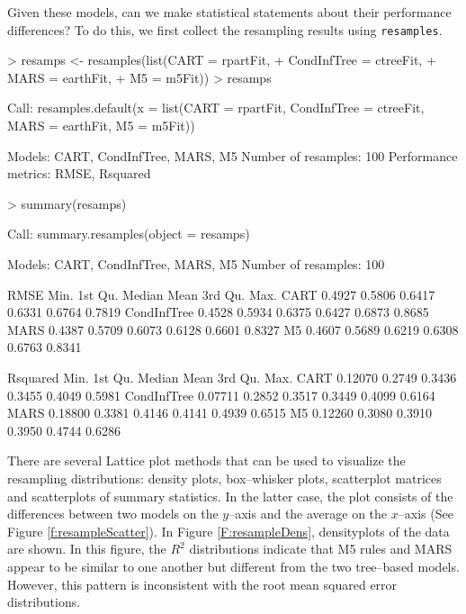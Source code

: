 \documentclass[12pt]{article}
\begin{document}
Given these models, can we make statistical statements about their performance differences? To do this, we first collect the resampling results using \texttt{resamples}.

\begin{Schunk}
\begin{Sinput}
> resamps <- resamples(list(CART = rpartFit,
+                           CondInfTree = ctreeFit,
+                           MARS = earthFit,
+                           M5 = m5Fit))
> resamps
\end{Sinput}
\begin{Soutput}
Call:
resamples.default(x = list(CART = rpartFit, CondInfTree = ctreeFit,     MARS = earthFit, M5 = m5Fit))

Models: CART, CondInfTree, MARS, M5 
Number of resamples: 100 
Performance metrics: RMSE, Rsquared 
\end{Soutput}
\begin{Sinput}
> summary(resamps)
\end{Sinput}
\begin{Soutput}
Call:
summary.resamples(object = resamps)

Models: CART, CondInfTree, MARS, M5 
Number of resamples: 100 

RMSE 
              Min. 1st Qu. Median   Mean 3rd Qu.   Max.
CART        0.4927  0.5806 0.6417 0.6331  0.6764 0.7819
CondInfTree 0.4528  0.5934 0.6375 0.6427  0.6873 0.8685
MARS        0.4387  0.5709 0.6073 0.6128  0.6601 0.8327
M5          0.4607  0.5689 0.6219 0.6308  0.6763 0.8341

Rsquared 
               Min. 1st Qu. Median   Mean 3rd Qu.   Max.
CART        0.12070  0.2749 0.3436 0.3455  0.4049 0.5981
CondInfTree 0.07711  0.2852 0.3517 0.3449  0.4099 0.6164
MARS        0.18800  0.3381 0.4146 0.4141  0.4939 0.6515
M5          0.12260  0.3080 0.3910 0.3950  0.4744 0.6286
\end{Soutput}
\end{Schunk}

There are several Lattice plot methods that can be used to visualize
the resampling distributions: density plots, box--whisker plots,
scatterplot matrices and scatterplots of summary statistics. In the
latter case, the plot consists of the differences between two models
on the $y$--axis and the average on the $x$--axis (See Figure
\ref{f:resampleScatter}). In Figure \ref{F:resampleDens}, densityplots
of the data are shown. In this figure,  the $R^2$ distributions
indicate that M5 rules and MARS appear to be
        similar to one another but different from the two tree--based
        models. However, this pattern is inconsistent with the root
        mean squared error distributions.
\end{document}
